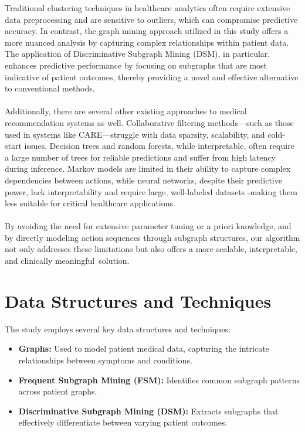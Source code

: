 \documentclass[12pt]{article}
\begin{document}
Traditional clustering techniques in healthcare analytics often require extensive data preprocessing and are sensitive to outliers, which can compromise predictive accuracy. In contrast, the graph mining approach utilized in this study offers a more nuanced analysis by capturing complex relationships within patient data. The application of Discriminative Subgraph Mining (DSM), in particular, enhances predictive performance by focusing on subgraphs that are most indicative of patient outcomes, thereby providing a novel and effective alternative to conventional methods.\\ \\
Additionally, there are several other existing approaches to medical recommendation systems as well. Collaborative filtering methods—such as those used in systems like CARE—struggle with data sparsity, scalability, and cold-start issues. Decision trees and random forests, while interpretable, often require a large number of trees for reliable predictions and suffer from high latency during inference. Markov models are limited in their ability to capture complex dependencies between actions, while neural networks, despite their predictive power, lack interpretability and require large, well-labeled datasets -making them less suitable for critical healthcare applications. \\ \\
By avoiding the need for extensive parameter tuning or a priori knowledge, and by directly modeling action sequences through subgraph structures, our algorithm not only addresses these limitations but also offers a more scalable, interpretable, and clinically meaningful solution.

\section{Data Structures and Techniques}

The study employs several key data structures and techniques:
\begin{itemize}
\item \textbf{Graphs:} Used to model patient medical data, capturing the intricate relationships between symptoms and conditions.
\item \textbf{Frequent Subgraph Mining (FSM):} Identifies common subgraph patterns across patient graphs.
\item \textbf{Discriminative Subgraph Mining (DSM):} Extracts subgraphs that effectively differentiate between varying patient outcomes.
\end{itemize}
\end{document}

